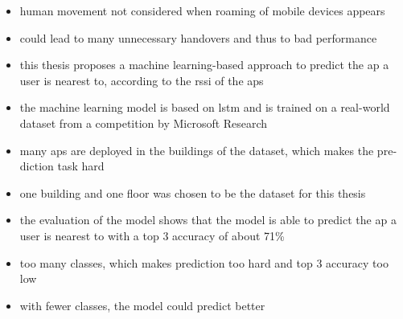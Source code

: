 
\null\vfil
\begin{otherlanguage}{english}
\begin{center}\textsf{\textbf{\abstractname}}\end{center}

\noindent 
\begin{itemize}
    \item human movement not considered when roaming of mobile devices appears
    \item could lead to many unnecessary handovers and thus to bad performance
    \item this thesis proposes a machine learning-based approach to predict the \ac{ap} a user is nearest to, according to the \ac{rssi} of the \acp{ap}
    \item the machine learning model is based on \ac{lstm} and is trained on a real-world dataset from a competition by Microsoft Research
    \item many \acp{ap} are deployed in the buildings of the dataset, which makes the prediction task hard
    \item one building and one floor was chosen to be the dataset for this thesis
    \item the evaluation of the model shows that the model is able to predict the \ac{ap} a user is nearest to with a top 3 accuracy of about 71\%
    \item too many classes, which makes prediction too hard and top 3 accuracy too low
    \item with fewer classes, the model could predict better
\end{itemize}

\end{otherlanguage}
\vfil\null





